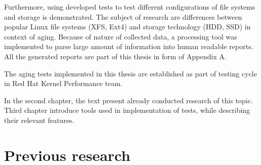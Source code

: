 \documentclass[
  color, %
  table, %
  lof,   %
  lot,   %
]{fithesis3}
\begin{document}
Furthermore, using developed tests to test different configurations of file systems and storage is demonstrated. The subject of research are differences between popular Linux file systems (XFS, Ext4) and storage technology (HDD, SSD) in context of aging. Because of nature of collected data, a processing tool was implemented to parse large amount of information into human readable reports. All the generated reports are part of this thesis in form of Appendix A.

The aging tests implemented in this thesis are established as part of testing cycle in Red Hat Kernel Performance team.

In the second chapter, the text present already conducted research of this topic. Third chapter introduce tools used in implementation of tests, while describing their relevant features.
\chapter{Previous research}











\end{document}
